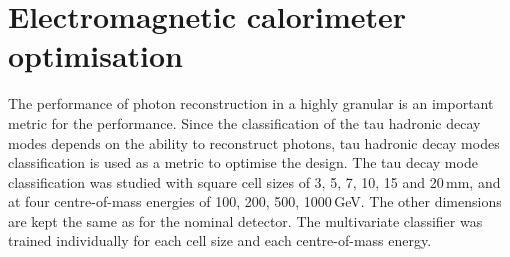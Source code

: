 










\section{Electromagnetic calorimeter optimisation}
\label{sec:tauECAL}

The performance of photon reconstruction in a highly granular \ECAL is an important  metric for the \ECAL performance. Since the classification of the tau hadronic decay modes depends on the ability to reconstruct photons, tau hadronic decay modes classification is used as a metric to optimise the \ECAL design. The tau decay mode classification was studied with \ECAL square cell sizes of 3, 5, 7, 10, 15 and 20\,mm, and at four  centre-of-mass energies of 100, 200, 500, 1000\,GeV. The other \ECAL dimensions are kept the same as for  the \ILD nominal detector. The multivariate classifier was trained  individually for each \ECAL cell size and each centre-of-mass energy.


